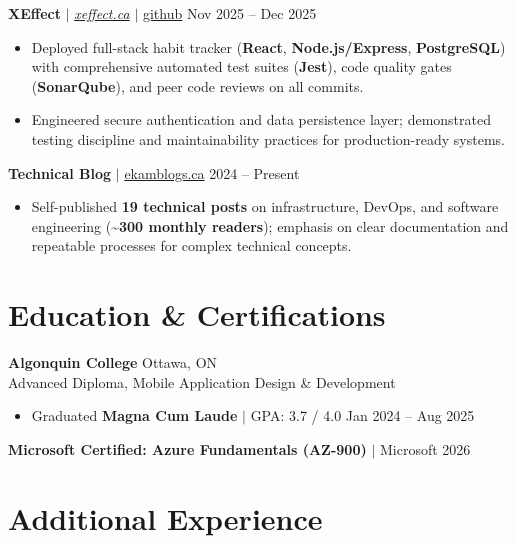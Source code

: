 \documentclass[11pt,a4paper]{article}
\begin{document}
\vspace{4pt}

\textbf{XEffect} $|$ \href{https://www.xeffect.ca/app}{\emph{xeffect.ca}} $|$ \href{https://github.com/bhat0155/xeffect}{\small github} \hfill Nov 2025 -- Dec 2025
\begin{itemize}
    \item Deployed full-stack habit tracker (\textbf{React}, \textbf{Node.js/Express}, \textbf{PostgreSQL}) with comprehensive automated test suites (\textbf{Jest}), code quality gates (\textbf{SonarQube}), and peer code reviews on all commits.
    \item Engineered secure authentication and data persistence layer; demonstrated testing discipline and maintainability practices for production-ready systems.
\end{itemize}

\vspace{4pt}

\textbf{Technical Blog} $|$ \href{https://www.ekamblogs.ca}{ekamblogs.ca} \hfill 2024 -- Present
\begin{itemize}
    \item Self-published \textbf{19 technical posts} on infrastructure, DevOps, and software engineering (\textasciitilde\textbf{300 monthly readers}); emphasis on clear documentation and repeatable processes for complex technical concepts.
\end{itemize}

\section{Education \& Certifications}

\textbf{Algonquin College} \hfill Ottawa, ON \\
Advanced Diploma, Mobile Application Design \& Development
\begin{itemize}
    \item Graduated \textbf{Magna Cum Laude} $|$ GPA: 3.7 / 4.0 \hfill Jan 2024 -- Aug 2025
\end{itemize}
\textbf{Microsoft Certified: Azure Fundamentals (AZ-900)} $|$ Microsoft \hfill 2026

\section{Additional Experience}
\end{document}
